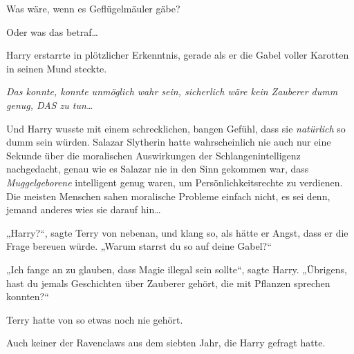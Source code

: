Was wäre, wenn es Geflügelmäuler gäbe?

Oder was das betraf…

Harry erstarrte in plötzlicher Erkenntnis, gerade als er die Gabel voller Karotten in seinen Mund steckte.

\emph{Das konnte, konnte unmöglich wahr sein, sicherlich wäre kein Zauberer dumm genug, DAS zu tun…}

Und Harry wusste mit einem schrecklichen, bangen Gefühl, dass sie \emph{natürlich} so dumm sein würden. Salazar Slytherin hatte wahrscheinlich nie auch nur eine Sekunde über die moralischen Auswirkungen der Schlangenintelligenz nachgedacht, genau wie es Salazar nie in den Sinn gekommen war, dass \emph{Muggelgeborene} intelligent genug waren, um Persönlichkeitsrechte zu verdienen. Die meisten Menschen sahen moralische Probleme einfach nicht, es sei denn, jemand anderes wies sie darauf hin…

„Harry?“, sagte Terry von nebenan, und klang so, als hätte er Angst, dass er die Frage bereuen würde. „Warum starrst du so auf deine Gabel?“

„Ich fange an zu glauben, dass Magie illegal sein sollte“, sagte Harry. „Übrigens, hast du jemals Geschichten über Zauberer gehört, die mit Pflanzen sprechen konnten?“

\later

Terry hatte von so etwas noch nie gehört.

Auch keiner der Ravenclaws aus dem siebten Jahr, die Harry gefragt hatte.

